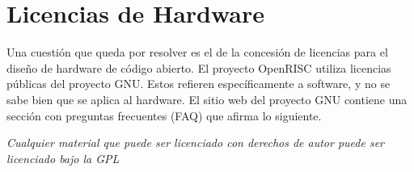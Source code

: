 
	

\section{Licencias de Hardware}

Una cuestión que queda por resolver es el de la concesión de licencias para el diseño de hardware de código abierto. El proyecto OpenRISC utiliza licencias públicas del proyecto GNU. Estos refieren específicamente a software, y no se sabe bien que se aplica al hardware. El sitio web del proyecto GNU contiene una sección con preguntas frecuentes (FAQ) que afirma lo siguiente.

\textit{Cualquier material que puede ser licenciado con derechos de autor puede ser licenciado bajo la GPL}

